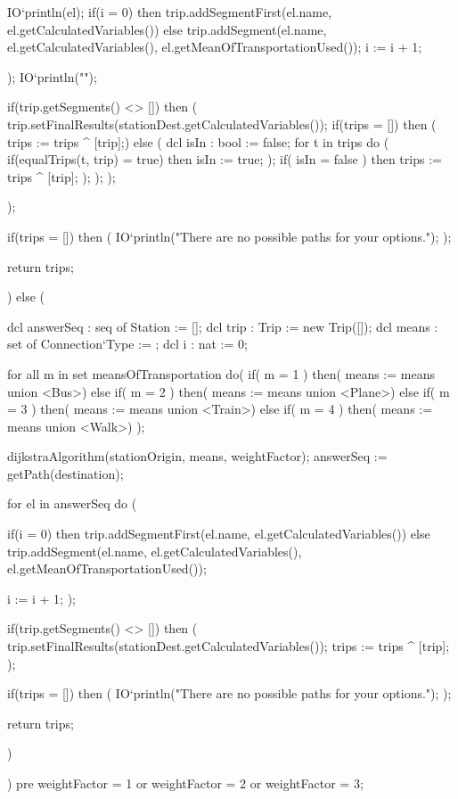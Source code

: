 \begin{vdmpp}[breaklines=true]
      IO`println(el);
      if(i = 0) then trip.addSegmentFirst(el.name, el.getCalculatedVariables())
      else trip.addSegment(el.name, el.getCalculatedVariables(), el.getMeanOfTransportationUsed());
      i := i + 1;
      
     );
     IO`println("\n\n");
     
     if(trip.getSegments() <> []) then (
      trip.setFinalResults(stationDest.getCalculatedVariables());
      if(trips = []) then (
        trips := trips ^ [trip];)
      else (
        dcl isIn : bool := false;
        for t in trips do (
          if(equalTrips(t, trip) = true) then
            isIn := true;
        );
        if( isIn = false ) then
          trips := trips ^ [trip];
      );
     );
    );
    
   );
   
   if(trips = []) then (
     IO`println("There are no possible paths for your options."); 
   );
   
   return trips;
   
   
  ) 
  else (
   
   dcl answerSeq : seq of Station := [];
   dcl trip : Trip := new Trip([]);
   dcl means : set of Connection`Type := {};
   dcl i : nat := 0;
   
   for all m in set meansOfTransportation do(
    if( m = 1 ) then(
    means := means union {<Bus>})
    else if( m = 2 ) then(
    means := means union {<Plane>})
    else if( m = 3 ) then(
    means := means union {<Train>})
    else if( m = 4 ) then(
    means := means union {<Walk>})
   );
   
   dijkstraAlgorithm(stationOrigin, means, weightFactor);
   answerSeq := getPath(destination);
   
   for el in answerSeq do (
   
      if(i = 0) then trip.addSegmentFirst(el.name, el.getCalculatedVariables())
     else trip.addSegment(el.name, el.getCalculatedVariables(), el.getMeanOfTransportationUsed());

     i := i + 1;
   );
     
   if(trip.getSegments() <> []) then (
      trip.setFinalResults(stationDest.getCalculatedVariables());
     trips := trips ^ [trip];
   );
   
   if(trips = []) then (
     IO`println("There are no possible paths for your options."); 
   );
   
   return trips;
   
  )
  
 )
 pre weightFactor = 1 or weightFactor = 2 or weightFactor = 3;
 

\end{vdmpp}
